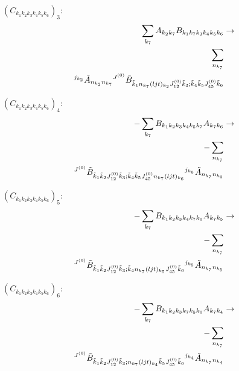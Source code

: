 \documentclass[11pt]{article}
\begin{document}
$\left({C}_{{k}_{1}{k}_{2}{k}_{3}{k}_{4}{k}_{5}{k}_{6}}\right)_{3}$:
\begin{align}
\sum_{{k}_{7}}{A}_{{k}_{2}{k}_{7}}{B}_{{k}_{1}{k}_{7}{k}_{3}{k}_{4}{k}_{5}{k}_{6}}&\rightarrow \notag \\\sum_{n_{{k}_{7}}}& \notag \\{}^{j_{{k}_{2}}}\tilde{A}_{n_{{k}_{2}}n_{{k}_{7}}}{}^{J^{(0)}}\tilde{B}_{\tilde{k}_{1}n_{{k}_{7}}(ljt)_{{k}_{2}}J^{(0)}_{12}\tilde{k}_{3};\tilde{k}_{4}\tilde{k}_{5}J^{(0)}_{45}\tilde{k}_{6}}& \notag \\
\end{align}

$\left({C}_{{k}_{1}{k}_{2}{k}_{3}{k}_{4}{k}_{5}{k}_{6}}\right)_{4}$:
\begin{align}
-\sum_{{k}_{7}}{B}_{{k}_{1}{k}_{2}{k}_{3}{k}_{4}{k}_{5}{k}_{7}}{A}_{{k}_{7}{k}_{6}}&\rightarrow \notag \\-\sum_{n_{{k}_{7}}}& \notag \\{}^{J^{(0)}}\tilde{B}_{\tilde{k}_{1}\tilde{k}_{2}J^{(0)}_{12}\tilde{k}_{3};\tilde{k}_{4}\tilde{k}_{5}J^{(0)}_{45}n_{{k}_{7}}(ljt)_{{k}_{6}}}{}^{j_{{k}_{6}}}\tilde{A}_{n_{{k}_{7}}n_{{k}_{6}}}& \notag \\
\end{align}

$\left({C}_{{k}_{1}{k}_{2}{k}_{3}{k}_{4}{k}_{5}{k}_{6}}\right)_{5}$:
\begin{align}
-\sum_{{k}_{7}}{B}_{{k}_{1}{k}_{2}{k}_{3}{k}_{4}{k}_{7}{k}_{6}}{A}_{{k}_{7}{k}_{5}}&\rightarrow \notag \\-\sum_{n_{{k}_{7}}}& \notag \\{}^{J^{(0)}}\tilde{B}_{\tilde{k}_{1}\tilde{k}_{2}J^{(0)}_{12}\tilde{k}_{3};\tilde{k}_{4}n_{{k}_{7}}(ljt)_{{k}_{5}}J^{(0)}_{45}\tilde{k}_{6}}{}^{j_{{k}_{5}}}\tilde{A}_{n_{{k}_{7}}n_{{k}_{5}}}& \notag \\
\end{align}

$\left({C}_{{k}_{1}{k}_{2}{k}_{3}{k}_{4}{k}_{5}{k}_{6}}\right)_{6}$:
\begin{align}
-\sum_{{k}_{7}}{B}_{{k}_{1}{k}_{2}{k}_{3}{k}_{7}{k}_{5}{k}_{6}}{A}_{{k}_{7}{k}_{4}}&\rightarrow \notag \\-\sum_{n_{{k}_{7}}}& \notag \\{}^{J^{(0)}}\tilde{B}_{\tilde{k}_{1}\tilde{k}_{2}J^{(0)}_{12}\tilde{k}_{3};n_{{k}_{7}}(ljt)_{{k}_{4}}\tilde{k}_{5}J^{(0)}_{45}\tilde{k}_{6}}{}^{j_{{k}_{4}}}\tilde{A}_{n_{{k}_{7}}n_{{k}_{4}}}& \notag \\
\end{align}
\end{document}
